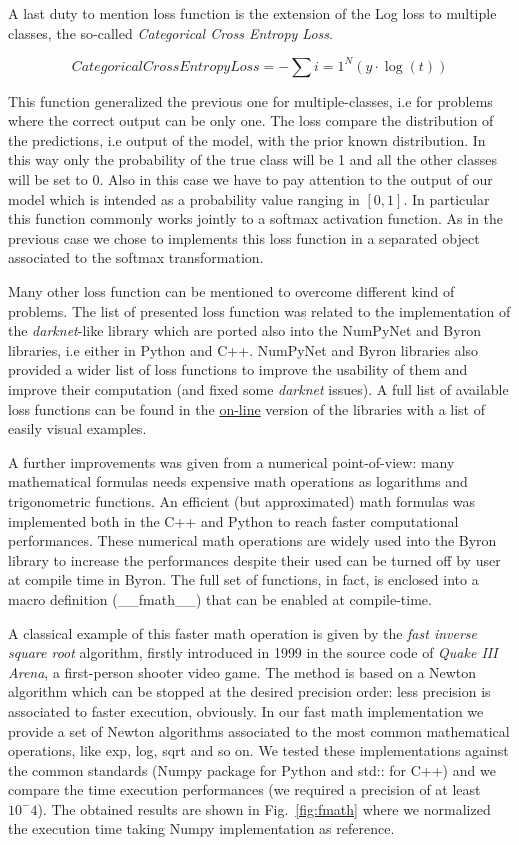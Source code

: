 \documentclass{standalone}
\begin{document}
A last duty to mention loss function is the extension of the Log loss to multiple classes, the so-called \emph{Categorical Cross Entropy Loss}.

$$
CategoricalCrossEntropyLoss = -\sum{i=1}^{N}\left( y\cdot\log(t) \right)
$$

This function generalized the previous one for multiple-classes, i.e for problems where the correct output can be only one.
The loss compare the distribution of the predictions, i.e output of the model, with the prior known distribution.
In this way only the probability of the true class will be 1 and all the other classes will be set to 0.
Also in this case we have to pay attention to the output of our model which is intended as a probability value ranging in $[0, 1]$.
In particular this function commonly works jointly to a softmax activation function.
As in the previous case we chose to implements this loss function in a separated object associated to the softmax transformation.

Many other loss function can be mentioned to overcome different kind of problems.
The list of presented loss function was related to the implementation of the \emph{darknet}-like library which are ported also into the NumPyNet and Byron libraries, i.e either in Python and C++.
NumPyNet and Byron libraries also provided a wider list of loss functions to improve the usability of them and improve their computation (and fixed some \emph{darknet} issues).
A full list of available loss functions can be found in the \href{https://github.com/Nico-Curti/Byron/blob/master/src/cost_layer.cpp}{on-line} version of the libraries with a list of easily visual examples.

A further improvements was given from a numerical point-of-view: many mathematical formulas needs expensive math operations as logarithms and trigonometric functions.
An efficient (but approximated) math formulas was implemented both in the C++ and Python to reach faster computational performances.
These numerical math operations are widely used into the Byron library to increase the performances despite their used can be turned off by user at compile time in Byron.
The full set of functions, in fact, is enclosed into a \textsf{macro} definition (\textsf{\_\_fmath\_\_}) that can be enabled at compile-time.

A classical example of this faster math operation is given by the \emph{fast inverse square root} algorithm, firstly introduced in 1999 in the source code of \emph{Quake III Arena}, a first-person shooter video game.
The method is based on a Newton algorithm which can be stopped at the desired precision order: less precision is associated to faster execution, obviously.
In our \textsf{fast math} implementation we provide a set of Newton algorithms associated to the most common mathematical operations, like \textsf{exp}, \textsf{log}, \textsf{sqrt} and so on.
We tested these implementations against the common standards (Numpy package for Python and \textsf{std::} for C++) and we compare the time execution performances (we required a precision of at least $10^-4$).
The obtained results are shown in Fig.~\ref{fig:fmath} where we normalized the execution time taking Numpy implementation as reference.
\end{document}
